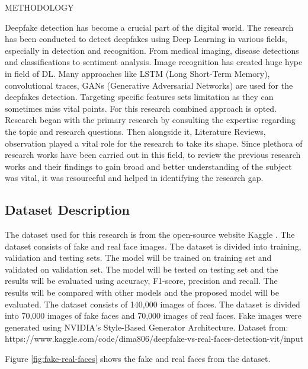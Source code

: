 \begin{section}[]{\uppercase{Methodology}}
 Deepfake detection has become a crucial part of the digital world. 
 The research has been conducted to detect deepfakes using Deep Learning in various fields, especially in detection and recognition. 
 From medical imaging, disease detections and classifications to sentiment analysis. 
 Image recognition has created huge hype in field of DL. Many approaches like LSTM (Long Short-Term Memory), convolutional traces, GANs (Generative Adversarial Networks) are used for the deepfakes detection. Targeting specific features sets limitation as they can sometimes miss vital points.
 For this research combined approach is opted. Research began with the primary research by consulting the expertise regarding the topic and research questions. 
 Then alongside it, Literature Reviews, observation played a vital role for the research to take its shape. 
 Since plethora of research works have been carried out in this field, to review the previous research works and their findings to gain broad and better understanding of the subject was vital, it was resourceful and helped in identifying the research gap.

 \subsection{Dataset Description}
  The dataset used for this research is from the open-source website Kaggle \cite{Kaggle140kFaces}. The dataset consists of fake and real face images. The dataset is divided into training, validation and testing sets. The model will be trained on training set and validated on validation set. The model will be tested on testing set and the results will be evaluated using accuracy, F1-score, precision and recall. The results will be compared with other models and the proposed model will be evaluated. The dataset consists of 140,000 images of faces. 
  The dataset is divided into 70,000 images of fake faces and 70,000 images of real faces. Fake images were generated using NVIDIA's Style-Based Generator Architecture.
  Dataset from: https://www.kaggle.com/code/dima806/deepfake-vs-real-faces-detection-vit/input
  
  \par Figure \ref{fig:fake-real-faces} shows the fake and real faces from the dataset.
  

\end{section}
